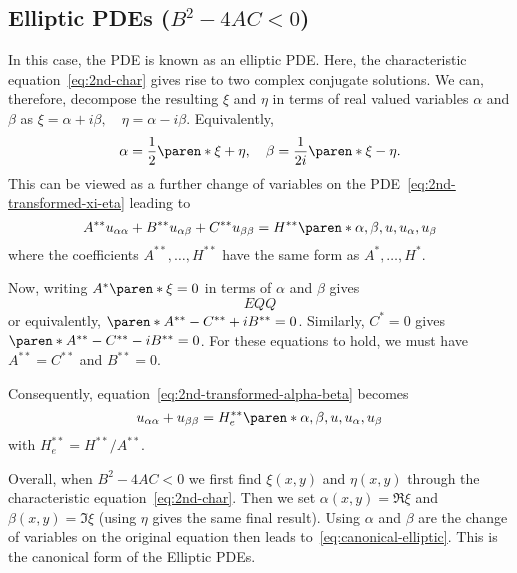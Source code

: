 \documentclass[11pt]{penrose}
\begin{document}
\subsection{Elliptic PDEs \texorpdfstring{($B^2 - 4AC < 0$)}{B2 - 4AC < 0}}
In this case, the PDE is known as an elliptic PDE. Here, the characteristic equation~\eqref{eq:2nd-char} gives rise to two complex conjugate solutions. We can, therefore, decompose the resulting $\xi$ and $\eta$ in terms of real valued variables $\alpha$ and $\beta$ as $\xi = \alpha + i\beta, \quad \eta = \alpha - i \beta$. Equivalently,
\begin{equation}
    \alpha = \frac{1}{2} \paren*{\xi + \eta},
    \quad
    \beta = \frac{1}{2i} \paren*{\xi - \eta}.
\end{equation}
This can be viewed as a further change of variables on the PDE~\eqref{eq:2nd-transformed-xi-eta} leading to
\begin{equation}
    A^{**} u_{\alpha\alpha} + B^{**} u_{\alpha\beta} + C^{**} u_{\beta\beta} = H^{**}\paren*{\alpha, \beta, u, u_\alpha, u_\beta}
    \label{eq:2nd-transformed-alpha-beta}
\end{equation}
where the coefficients $A^{**}, \dots, H^{**}$ have the same form as $A^{*}, \dots, H^{*}$.

Now, writing $A^{*}\paren*{\xi} = 0$ in terms of $\alpha$ and $\beta$ gives
\begin{equation}
    EQQ
\end{equation}
or equivalently, $\paren*{A^{**} - C^{**}} + i B^{**} = 0$. Similarly, $C^{*} = 0$ gives $\paren*{A^{**} - C^{**}} - i B^{**} = 0$. For these equations to hold, we must have $A^{**} = C^{**}$ and $B^{**} = 0$.

Consequently, equation~\eqref{eq:2nd-transformed-alpha-beta} becomes
\begin{equation}
    u_{\alpha\alpha} + u_{\beta\beta} = H_{e}^{**} \paren*{\alpha, \beta, u, u_\alpha, u_\beta}
    \label{eq:canonical-elliptic}
\end{equation}
with $H_{e}^{**} = H^{**} / A^{**}$.

Overall, when $B^2 - 4AC < 0$ we first find $\xi(x,y)$ and $\eta(x,y)$ through the characteristic equation~\eqref{eq:2nd-char}. Then we set $\alpha(x,y) = \Re \xi$ and $\beta(x,y) = \Im \xi$ (using $\eta$ gives the same final result). Using $\alpha$ and $\beta$ are the change of variables on the original equation then leads to~\eqref{eq:canonical-elliptic}. This is the canonical form of the Elliptic PDEs.
\end{document}
